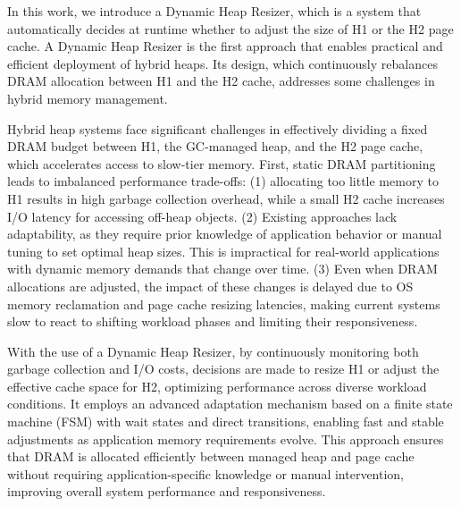 In this work, we introduce a Dynamic Heap Resizer, which is a system that
automatically decides at runtime whether to adjust the size of H1 or the H2 page
cache. A Dynamic Heap Resizer is the first approach that enables practical and
efficient deployment of hybrid heaps. Its design, which continuously rebalances
DRAM allocation between H1 and the H2 cache, addresses some challenges in hybrid
memory management.

Hybrid heap systems face significant challenges in effectively dividing a fixed
DRAM budget between H1, the GC-managed heap, and the H2 page cache, which
accelerates access to slow-tier memory. First, static DRAM partitioning leads to
imbalanced performance trade-offs: (1) allocating too little memory to H1
results in high garbage collection overhead, while a small H2 cache increases
I/O latency for accessing off-heap objects. (2) Existing approaches lack
adaptability, as they require prior knowledge of application behavior or manual
tuning to set optimal heap sizes. This is impractical for real-world
applications with dynamic memory demands that change over time. (3) Even when
DRAM allocations are adjusted, the impact of these changes is delayed due to OS
memory reclamation and page cache resizing latencies, making current systems
slow to react to shifting workload phases and limiting their responsiveness.

With the use of a Dynamic Heap Resizer, by continuously monitoring both garbage
collection and I/O costs, decisions are made to resize H1 or adjust the
effective cache space for H2, optimizing performance across diverse workload
conditions. It employs an advanced adaptation mechanism based on a finite state
machine (FSM) with wait states and direct transitions, enabling fast and stable
adjustments as application memory requirements evolve. This approach ensures
that DRAM is allocated efficiently between managed heap and page cache without
requiring application-specific knowledge or manual intervention, improving
overall system performance and responsiveness.
